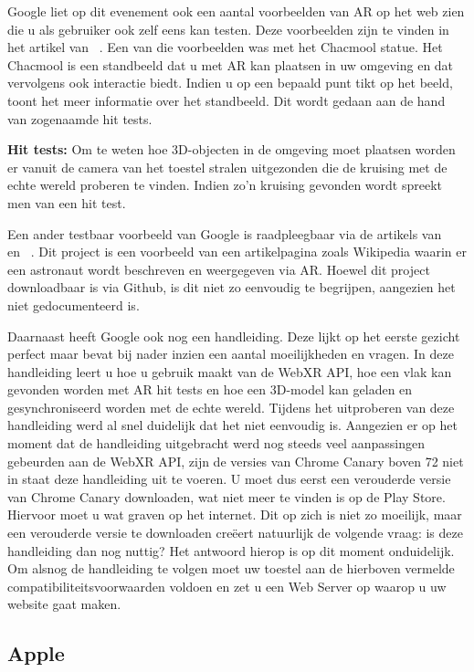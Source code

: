 Google liet op dit evenement ook een aantal voorbeelden van AR op het web zien die u als gebruiker ook zelf eens kan testen. Deze voorbeelden zijn te vinden in het artikel van ~\textcite{Medley2018}. Een van die voorbeelden was met het Chacmool statue. Het Chacmool is een standbeeld dat u met AR kan plaatsen in uw omgeving en dat vervolgens ook interactie biedt. Indien u op een bepaald punt tikt op het beeld, toont het meer informatie over het standbeeld. Dit wordt gedaan aan de hand van zogenaamde hit tests. 

\textbf{Hit tests:} 
Om te weten hoe 3D-objecten in de omgeving moet plaatsen worden er vanuit de camera van het toestel stralen uitgezonden die de kruising met de echte wereld proberen te vinden. Indien zo'n kruising gevonden wordt spreekt men van een hit test. 

Een ander testbaar voorbeeld van Google is raadpleegbaar via de artikels van ~\textcite{Stanush2018} en ~\textcite{Ali2018}. 
Dit project is een voorbeeld van een artikelpagina zoals Wikipedia waarin er een astronaut wordt beschreven en weergegeven via AR. Hoewel dit project downloadbaar is via Github, is dit niet zo eenvoudig te begrijpen, aangezien het niet gedocumenteerd is. 

Daarnaast heeft Google ook nog een handleiding. Deze lijkt op het eerste gezicht perfect maar bevat bij nader inzien een aantal moeilijkheden en vragen. 
In deze handleiding leert u hoe u gebruik maakt van de WebXR API, hoe een vlak kan gevonden worden met AR hit tests en hoe een 3D-model kan geladen en gesynchroniseerd worden met de echte wereld. Tijdens het uitproberen van deze handleiding werd al snel duidelijk dat het niet eenvoudig is. Aangezien er op het moment dat de handleiding uitgebracht werd nog steeds veel aanpassingen gebeurden aan de WebXR API, zijn de versies van Chrome Canary boven 72 niet in staat deze handleiding uit te voeren. U moet dus eerst een verouderde versie van Chrome Canary downloaden, wat niet meer te vinden is op de Play Store. Hiervoor moet u wat graven op het internet. Dit op zich is niet zo moeilijk, maar een verouderde versie te downloaden creëert natuurlijk de volgende vraag: is deze handleiding dan nog nuttig? Het antwoord hierop is op dit moment onduidelijk. Om alsnog de handleiding te volgen moet uw toestel aan de hierboven vermelde compatibiliteitsvoorwaarden voldoen en zet u een Web Server op waarop u uw website gaat maken. 


\subsection{Apple}

